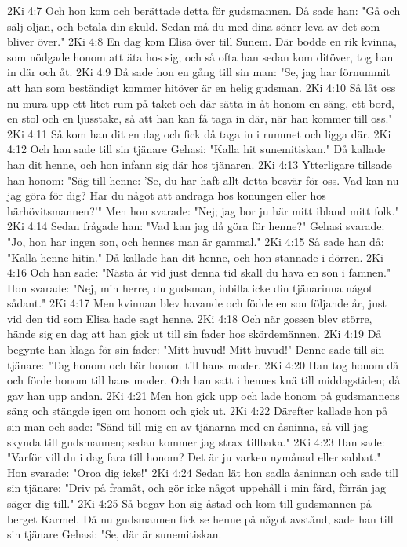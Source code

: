2Ki 4:7  Och hon kom och berättade detta för gudsmannen. Då sade han: "Gå och sälj oljan, och betala din skuld. Sedan må du med dina söner leva av det som bliver över."
2Ki 4:8  En dag kom Elisa över till Sunem. Där bodde en rik kvinna, som nödgade honom att äta hos sig; och så ofta han sedan kom ditöver, tog han in där och åt.
2Ki 4:9  Då sade hon en gång till sin man: "Se, jag har förnummit att han som beständigt kommer hitöver är en helig gudsman.
2Ki 4:10  Så låt oss nu mura upp ett litet rum på taket och där sätta in åt honom en säng, ett bord, en stol och en ljusstake, så att han kan få taga in där, när han kommer till oss."
2Ki 4:11  Så kom han dit en dag och fick då taga in i rummet och ligga där.
2Ki 4:12  Och han sade till sin tjänare Gehasi: "Kalla hit sunemitiskan." Då kallade han dit henne, och hon infann sig där hos tjänaren.
2Ki 4:13  Ytterligare tillsade han honom: "Säg till henne: 'Se, du har haft allt detta besvär för oss. Vad kan nu jag göra för dig? Har du något att andraga hos konungen eller hos härhövitsmannen?'" Men hon svarade: "Nej; jag bor ju här mitt ibland mitt folk."
2Ki 4:14  Sedan frågade han: "Vad kan jag då göra för henne?" Gehasi svarade: "Jo, hon har ingen son, och hennes man är gammal."
2Ki 4:15  Så sade han då: "Kalla henne hitin." Då kallade han dit henne, och hon stannade i dörren.
2Ki 4:16  Och han sade: "Nästa år vid just denna tid skall du hava en son i famnen." Hon svarade: "Nej, min herre, du gudsman, inbilla icke din tjänarinna något sådant."
2Ki 4:17  Men kvinnan blev havande och födde en son följande år, just vid den tid som Elisa hade sagt henne.
2Ki 4:18  Och när gossen blev större, hände sig en dag att han gick ut till sin fader hos skördemännen.
2Ki 4:19  Då begynte han klaga för sin fader: "Mitt huvud! Mitt huvud!" Denne sade till sin tjänare: "Tag honom och bär honom till hans moder.
2Ki 4:20  Han tog honom då och förde honom till hans moder. Och han satt i hennes knä till middagstiden; då gav han upp andan.
2Ki 4:21  Men hon gick upp och lade honom på gudsmannens säng och stängde igen om honom och gick ut.
2Ki 4:22  Därefter kallade hon på sin man och sade: "Sänd till mig en av tjänarna med en åsninna, så vill jag skynda till gudsmannen; sedan kommer jag strax tillbaka."
2Ki 4:23  Han sade: "Varför vill du i dag fara till honom? Det är ju varken nymånad eller sabbat." Hon svarade: "Oroa dig icke!"
2Ki 4:24  Sedan lät hon sadla åsninnan och sade till sin tjänare: "Driv på framåt, och gör icke något uppehåll i min färd, förrän jag säger dig till."
2Ki 4:25  Så begav hon sig åstad och kom till gudsmannen på berget Karmel. Då nu gudsmannen fick se henne på något avstånd, sade han till sin tjänare Gehasi: "Se, där är sunemitiskan.
